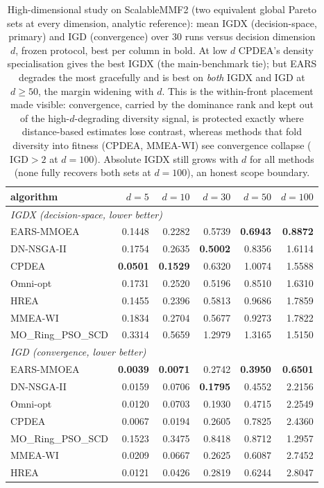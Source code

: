 \begin{table}[t]
\centering\small
\caption{High-dimensional study on ScalableMMF2 (two equivalent global Pareto sets at every dimension, analytic reference): mean IGDX (decision-space, primary) and IGD (convergence) over $30$ runs versus decision dimension $d$, frozen protocol, best per column in bold. At low $d$ CPDEA's density specialisation gives the best IGDX (the main-benchmark tie); but EARS degrades the most gracefully and is best on \emph{both} IGDX and IGD at $d\!\ge\!50$, the margin widening with $d$. This is the within-front placement made visible: convergence, carried by the dominance rank and kept out of the high-$d$-degrading diversity signal, is protected exactly where distance-based estimates lose contrast, whereas methods that fold diversity into fitness (CPDEA, MMEA-WI) see convergence collapse ($\mathrm{IGD}\!>\!2$ at $d{=}100$). Absolute IGDX still grows with $d$ for all methods (none fully recovers both sets at $d{=}100$), an honest scope boundary.}
\label{tab:highdim}
\begin{tabular}{lrrrrr}
\toprule
algorithm & $d{=}5$ & $d{=}10$ & $d{=}30$ & $d{=}50$ & $d{=}100$ \\
\midrule
\multicolumn{6}{l}{\emph{IGDX (decision-space, lower better)}}\\
EARS-MMOEA & 0.1448 & 0.2282 & 0.5739 & \textbf{0.6943} & \textbf{0.8872} \\
DN-NSGA-II & 0.1754 & 0.2635 & \textbf{0.5002} & 0.8356 & 1.6114 \\
CPDEA & \textbf{0.0501} & \textbf{0.1529} & 0.6320 & 1.0074 & 1.5588 \\
Omni-opt & 0.1731 & 0.2520 & 0.5196 & 0.8510 & 1.6310 \\
HREA & 0.1455 & 0.2396 & 0.5813 & 0.9686 & 1.7859 \\
MMEA-WI & 0.1834 & 0.2704 & 0.5677 & 0.9273 & 1.7822 \\
MO\_Ring\_PSO\_SCD & 0.3314 & 0.5659 & 1.2979 & 1.3165 & 1.5150 \\
\midrule
\multicolumn{6}{l}{\emph{IGD (convergence, lower better)}}\\
EARS-MMOEA & \textbf{0.0039} & \textbf{0.0071} & 0.2742 & \textbf{0.3950} & \textbf{0.6501} \\
DN-NSGA-II & 0.0159 & 0.0706 & \textbf{0.1795} & 0.4552 & 2.2156 \\
Omni-opt & 0.0120 & 0.0703 & 0.1930 & 0.4715 & 2.2549 \\
CPDEA & 0.0067 & 0.0194 & 0.2605 & 0.7825 & 2.4360 \\
MO\_Ring\_PSO\_SCD & 0.1523 & 0.3475 & 0.8418 & 0.8712 & 1.2957 \\
MMEA-WI & 0.0209 & 0.0667 & 0.2625 & 0.6087 & 2.7452 \\
HREA & 0.0121 & 0.0426 & 0.2819 & 0.6244 & 2.8047 \\
\bottomrule
\end{tabular}
\end{table}
